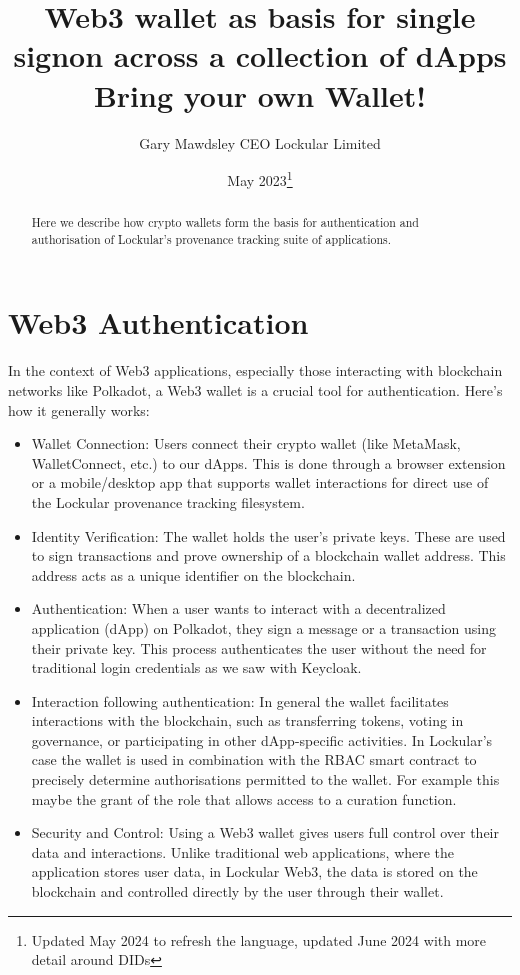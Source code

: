 \documentclass{tufte-handout}
\title{Web3 wallet as basis for single signon across a collection of dApps \\
\large Bring your own Wallet!}
\author[Gary Mawdsley]{Gary Mawdsley CEO Lockular Limited}
\date{May 2023\thanks{Updated May 2024 to refresh the language, updated June 2024 with more detail around DIDs}}  %
\begin{document}
\maketitle%

\begin{abstract}
\noindent Here we describe how crypto wallets form the basis for authentication and authorisation of Lockular's provenance tracking suite of applications.

\end{abstract}


\section{Web3 Authentication}\label{sec:page-layout}

In the context of Web3 applications, especially those interacting with blockchain networks like Polkadot, a Web3 wallet is a crucial tool for authentication.
Here's how it generally works:
\begin{itemize}
   \item Wallet Connection: Users connect their crypto wallet (like MetaMask, WalletConnect, etc.) to our dApps. This is done through a browser extension
    or a mobile/desktop app that supports wallet interactions for direct use of the Lockular provenance tracking filesystem.
    \item Identity Verification: The wallet holds the user's private keys. These are used to sign transactions and prove ownership of a blockchain wallet address. This address
    acts as a unique identifier on the blockchain.
    \item Authentication: When a user wants to interact with a decentralized application (dApp) on Polkadot, they sign a message or a transaction using their
    private key. This process authenticates the user without the need for traditional login credentials as we saw with Keycloak.
    \item Interaction following authentication: In general the wallet facilitates interactions with the blockchain, such as transferring tokens, voting in governance, or participating
    in other dApp-specific activities. In Lockular's case the wallet is used in combination with the RBAC smart contract to precisely determine authorisations permitted to the wallet.
    For example this maybe the grant of the role that allows access to a curation function.
    \item Security and Control: Using a Web3 wallet gives users full control over their data and interactions. Unlike traditional web applications, where the application
    stores user data, in Lockular Web3, the data is stored on the blockchain and controlled directly by the user through their wallet.
 \end{itemize}
\end{document}
